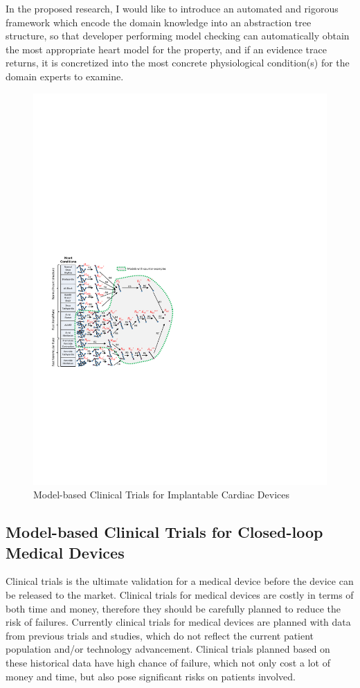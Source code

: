 \documentclass[a4paper,11pt]{article}
\begin{document}
In the proposed research, I would like to introduce an automated and rigorous framework which encode the domain knowledge into an abstraction tree structure, so that developer performing model checking can automatically obtain the most appropriate heart model for the property, and if an evidence trace returns, it is concretized into the most concrete physiological condition(s) for the domain experts to examine.
\begin{figure}[t]
	\centering
	\includegraphics[scale=0.7]{figs/abs.pdf}
	\caption{\small Model-based Clinical Trials for Implantable Cardiac Devices}
	\label{fig:mbct}
\end{figure}
\subsection{Model-based Clinical Trials for Closed-loop Medical Devices}
Clinical trials is the ultimate validation for a medical device before the device can be released to the market.
Clinical trials for medical devices are costly in terms of both time and money, therefore they should be carefully planned to reduce the risk of failures.
Currently clinical trials for medical devices are planned with data from previous trials and studies, which do not reflect the current patient population and/or technology advancement.
Clinical trials planned based on these historical data have high chance of failure, which not only cost a lot of money and time, but also pose significant risks on patients involved.
\end{document}
